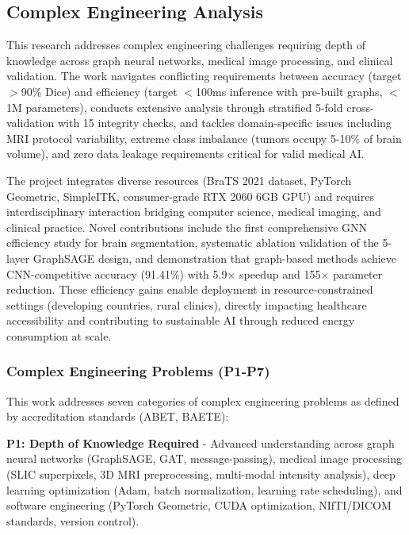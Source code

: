 \documentclass{article}
\begin{document}
\subsection{Complex Engineering Analysis}

This research addresses complex engineering challenges requiring depth of knowledge across graph neural networks, medical image processing, and clinical validation. The work navigates conflicting requirements between accuracy (target $>$90\% Dice) and efficiency (target $<$100ms inference with pre-built graphs, $<$1M parameters), conducts extensive analysis through stratified 5-fold cross-validation with 15 integrity checks, and tackles domain-specific issues including MRI protocol variability, extreme class imbalance (tumors occupy 5-10\% of brain volume), and zero data leakage requirements critical for valid medical AI.

The project integrates diverse resources (BraTS 2021 dataset, PyTorch Geometric, SimpleITK, consumer-grade RTX 2060 6GB GPU) and requires interdisciplinary interaction bridging computer science, medical imaging, and clinical practice. Novel contributions include the first comprehensive GNN efficiency study for brain segmentation, systematic ablation validation of the 5-layer GraphSAGE design, and demonstration that graph-based methods achieve CNN-competitive accuracy (91.41\%) with 5.9$\times$ speedup and 155$\times$ parameter reduction. These efficiency gains enable deployment in resource-constrained settings (developing countries, rural clinics), directly impacting healthcare accessibility and contributing to sustainable AI through reduced energy consumption at scale.

\subsubsection{Complex Engineering Problems (P1-P7)}

This work addresses seven categories of complex engineering problems as defined by accreditation standards (ABET, BAETE):

\textbf{P1: Depth of Knowledge Required} - Advanced understanding across graph neural networks (GraphSAGE, GAT, message-passing), medical image processing (SLIC superpixels, 3D MRI preprocessing, multi-modal intensity analysis), deep learning optimization (Adam, batch normalization, learning rate scheduling), and software engineering (PyTorch Geometric, CUDA optimization, NIfTI/DICOM standards, version control).
\end{document}

